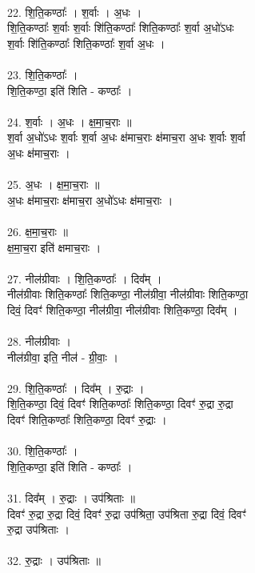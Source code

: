 \\
22. शि॒ति॒कण्ठाः᳚ । श॒र्वाः । अ॒धः ।\\
शि॒ति॒कण्ठाः᳚ श॒र्वाः श॒र्वाः शि॑ति॒कण्ठाः᳚ शिति॒कण्ठाः᳚ श॒र्वा अ॒धो॑ऽधः\\
श॒र्वाः शि॑ति॒कण्ठाः᳚ शिति॒कण्ठाः᳚ श॒र्वा अ॒धः ।\\
\\
23. शि॒ति॒कण्ठाः᳚ ।\\
शि॒ति॒कण्ठा॒ इति॑ शिति - कण्ठाः᳚ ।\\
\\
24. श॒र्वाः । अ॒धः । क्ष॒मा॒च॒राः ॥\\
श॒र्वा अ॒धो॑ऽधः श॒र्वाः श॒र्वा अ॒धः क्ष॑माच॒राः क्ष॑माच॒रा अ॒धः श॒र्वाः श॒र्वा\\
अ॒धः क्ष॑माच॒राः ।\\
\\
25. अ॒धः । क्ष॒मा॒च॒राः ॥\\
अ॒धः क्ष॑माच॒राः क्ष॑माच॒रा अ॒धो॑ऽधः क्ष॑माच॒राः ।\\
\\
26. क्ष॒मा॒च॒राः ॥\\
क्ष॒मा॒च॒रा इति॑ क्षमाच॒राः ।\\
\\
27. नील॑ग्रीवाः । शि॒ति॒कण्ठाः᳚ । दिव᳚म् ।\\
नील॑ग्रीवाः शिति॒कण्ठाः᳚ शिति॒कण्ठा॒ नील॑ग्रीवा॒ नील॑ग्रीवाः शिति॒कण्ठा॒\\
दिवं॒ दिवꣳ॑ शिति॒कण्ठा॒ नील॑ग्रीवा॒ नील॑ग्रीवाः शिति॒कण्ठा॒ दिव᳚म् ।\\
\\
28. नील॑ग्रीवाः ।\\
नील॑ग्रीवा॒ इति॒ नील॑ - ग्री॒वाः॒ ।\\
\\
29. शि॒ति॒कण्ठाः᳚ । दिव᳚म् । रु॒द्राः ।\\
शि॒ति॒कण्ठा॒ दिवं॒ दिवꣳ॑ शिति॒कण्ठाः᳚ शिति॒कण्ठा॒ दिवꣳ॑ रु॒द्रा रु॒द्रा\\
दिवꣳ॑ शिति॒कण्ठाः᳚ शिति॒कण्ठा॒ दिवꣳ॑ रु॒द्राः ।\\
\\
30. शि॒ति॒कण्ठाः᳚ ।\\
शि॒ति॒कण्ठा॒ इति॑ शिति - कण्ठाः᳚ ।\\
\\
31. दिव᳚म् । रु॒द्राः । उप॑श्रिताः ॥\\
दिवꣳ॑ रु॒द्रा रु॒द्रा दिवं॒ दिवꣳ॑ रु॒द्रा उप॑श्रिता॒ उप॑श्रिता रु॒द्रा दिवं॒ दिवꣳ॑\\
रु॒द्रा उप॑श्रिताः ।\\
\\
32. रु॒द्राः । उप॑श्रिताः ॥\\
